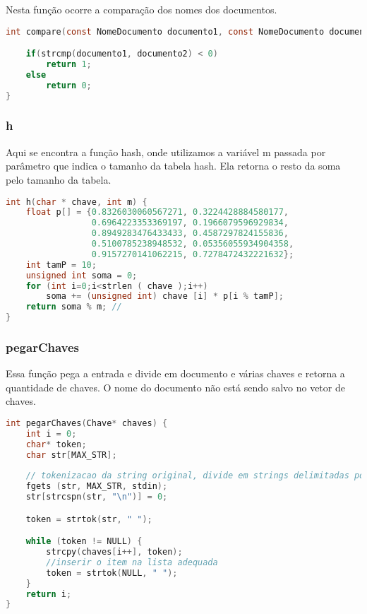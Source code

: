 \documentclass{article}
\begin{document}
Nesta função ocorre a comparação dos nomes dos documentos.
\begin{lstlisting}[caption={Função compare},label={lst:cod7},language=C]
int compare(const NomeDocumento documento1, const NomeDocumento documento2) {

    if(strcmp(documento1, documento2) < 0)
        return 1;
    else
        return 0;
}
\end{lstlisting}

\subsubsection{h}

Aqui se encontra a função hash, onde utilizamos a variável m passada por parâmetro que indica o tamanho da tabela hash. Ela retorna o resto da soma pelo tamanho da tabela.
\begin{lstlisting}[caption={Função h},label={lst:cod7},language=C]
int h(char * chave, int m) {
    float p[] = {0.8326030060567271, 0.3224428884580177, 
                 0.6964223353369197, 0.1966079596929834, 
                 0.8949283476433433, 0.4587297824155836, 
                 0.5100785238948532, 0.05356055934904358, 
                 0.9157270141062215, 0.7278472432221632};
    int tamP = 10;
    unsigned int soma = 0;
    for (int i=0;i<strlen ( chave );i++)
        soma += (unsigned int) chave [i] * p[i % tamP];
    return soma % m; //
}
\end{lstlisting}

\subsubsection{pegarChaves}

Essa função pega a entrada e divide em documento e várias chaves e retorna a quantidade de chaves. O nome do documento não está sendo salvo no vetor de chaves.
\begin{lstlisting}[caption={Função pegarChaves},label={lst:cod7},language=C]
int pegarChaves(Chave* chaves) {
    int i = 0;
    char* token;
    char str[MAX_STR];
    
    // tokenizacao da string original, divide em strings delimitadas por espaco em branco
    fgets (str, MAX_STR, stdin);
    str[strcspn(str, "\n")] = 0;

    token = strtok(str, " ");

    while (token != NULL) {
        strcpy(chaves[i++], token);
        //inserir o item na lista adequada
        token = strtok(NULL, " ");
    }
    return i;
}
\end{lstlisting}
\end{document}
